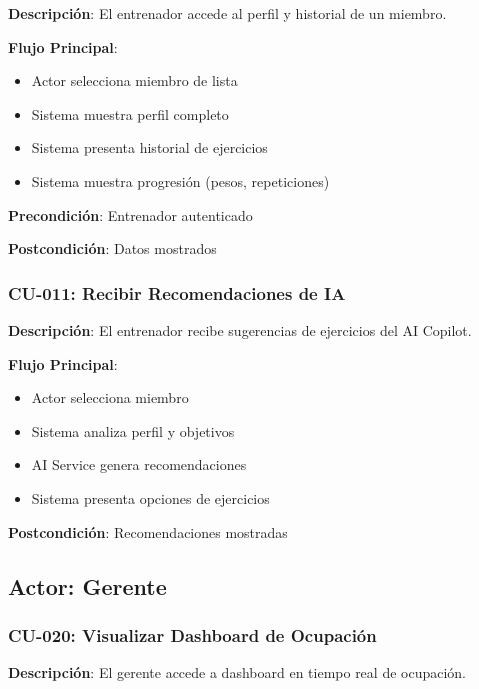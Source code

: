 \documentclass[11pt,a4paper]{article}
\begin{document}
\begin{itemize}
\begin{definicion}
\textbf{Descripción}: El entrenador accede al perfil y historial de un miembro.

\textbf{Flujo Principal}:
\begin{itemize}
    \item Actor selecciona miembro de lista
    \item Sistema muestra perfil completo
    \item Sistema presenta historial de ejercicios
    \item Sistema muestra progresión (pesos, repeticiones)
\end{itemize}

\textbf{Precondición}: Entrenador autenticado

\textbf{Postcondición}: Datos mostrados
\end{definicion}

\subsubsection{CU-011: Recibir Recomendaciones de IA}

\begin{definicion}
\textbf{Descripción}: El entrenador recibe sugerencias de ejercicios del AI Copilot.

\textbf{Flujo Principal}:
\begin{itemize}
    \item Actor selecciona miembro
    \item Sistema analiza perfil y objetivos
    \item AI Service genera recomendaciones
    \item Sistema presenta opciones de ejercicios
\end{itemize}

\textbf{Postcondición}: Recomendaciones mostradas
\end{definicion}

\subsection{Actor: Gerente}

\subsubsection{CU-020: Visualizar Dashboard de Ocupación}

\begin{definicion}
\textbf{Descripción}: El gerente accede a dashboard en tiempo real de ocupación.


\end{definicion}
\end{itemize}
\end{document}
